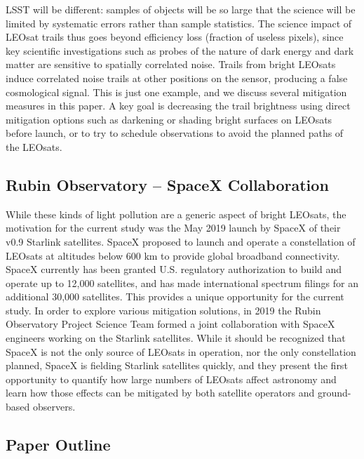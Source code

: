 \documentclass[twocolumn,trackchanges]{aastex63}
\begin{document}
LSST will be different: samples of objects will be so large that the science will be limited by systematic errors rather than sample statistics.
The science impact of LEOsat trails thus goes beyond efficiency loss (fraction of useless pixels), since key scientific investigations such as probes of the nature of dark energy and dark matter are sensitive to spatially correlated noise. Trails from bright LEOsats induce correlated noise trails at other positions on the sensor, producing a false cosmological signal. This is just one example, and we discuss several mitigation measures in this paper. A key goal is decreasing the trail brightness using direct mitigation options such as darkening or shading bright surfaces on LEOsats before launch, or to try to schedule observations to avoid the planned paths of the LEOsats.


\subsection{Rubin Observatory -- SpaceX Collaboration} \label{subsec:collab}

While these kinds of light pollution are a generic aspect of bright LEOsats, the motivation for the current study was the May 2019 launch by SpaceX of their v0.9 Starlink satellites.  SpaceX proposed to launch and operate a constellation of LEOsats at altitudes below 600 km to provide global broadband connectivity.  SpaceX currently has been granted U.S. regulatory authorization to build and operate up to 12,000 satellites, and has made international spectrum filings for an additional 30,000 satellites. This provides a unique opportunity for the current study.
In order to explore various mitigation solutions, in 2019 the Rubin Observatory Project Science Team formed a joint collaboration with SpaceX engineers working on the Starlink satellites. While it should be recognized that SpaceX is not the only source of LEOsats in operation, nor the only constellation planned, SpaceX is fielding Starlink satellites quickly, and they present the first opportunity to quantify how large numbers of LEOsats affect astronomy and learn how those effects can be mitigated by both satellite operators and ground-based observers.

\subsection{Paper Outline} \label{outline}
\end{document}
